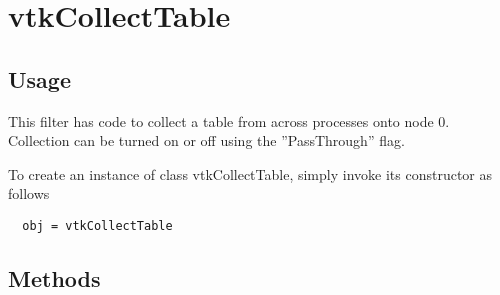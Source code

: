 \section{vtkCollectTable}

\subsection{Usage}

 This filter has code to collect a table from across processes onto node 0.
 Collection can be turned on or off using the ''PassThrough'' flag.

To create an instance of class vtkCollectTable, simply
invoke its constructor as follows
\begin{verbatim}
  obj = vtkCollectTable
\end{verbatim}
\subsection{Methods}

